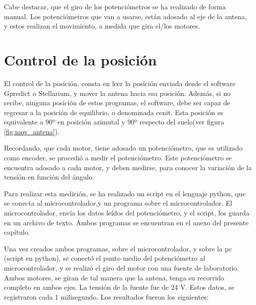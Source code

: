 Cabe destacar, que el giro de los potenciómetros se ha realizado de forma manual. Los potenciómetros que van a usarse, están adosado al eje de la antena, y estos realizan el movimiento, a medida que gira el/los motores.  

\section{Control de la posición}
El control de la posición, consta en leer la posición enviada desde el software Gpredict o Stellarium, y mover la antena hacia esa posición. Además, si no recibe, ninguna posición de estos programas, el software, debe ser capaz de regresar a la posición de equilibrio, o denominada cenit. Esta posición es equivalente a 90º en posición azimutal y 90º respecto del suelo(ver figura \ref{fig:mov_antena}). 

Recordando, que cada motor, tiene adosado un potenciómetro, que es utilizado como encoder, se procedió a medir el potenciómetro. Este potenciómetro se encuentra adosado a cada motor, y deben medirse, para conocer la variación de la tensión en función del ángulo. 

Para realizar esta medición, se ha realizado un script en el lenguaje python, que se conecta al microcontrolador,y un programa sobre el microcontrolador. El microcontrolador, envía los datos leídos del potenciómetro, y el script, los guarda en un archivo de texto. Ambos programas se encuentran en el anexo del presente capítulo.

Una vez creados ambos programas, sobre el microcontrolador, y sobre la pc (script en python), se conectó el punto medio del potenciómetro al microcontrolador, y se realizó el giro del motor con una fuente de laboratorio. Ambos motores, se giran de tal manera que la antena, tenga su recorrido completo en ambos ejes. La tensión de la fuente fue de 24 V. Estos datos, se registraron cada 1 milisegundo. Los resultados fueron los siguientes: 


